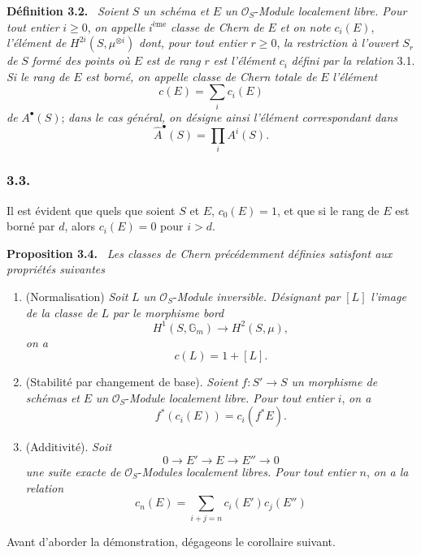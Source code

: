 \documentclass[11pt]{article}
\newenvironment{statement}[1]{\par\medskip\noindent\textbf{#1.}\ }{\par\medskip}
\begin{document}
\begin{statement}{Définition 3.2}
\emph{Soient} $S$ \emph{un schéma et} $E$ \emph{un} $\mathcal O_S$-\emph{Module localement libre. Pour tout entier} $i\ge0$, \emph{on appelle} $i^{\text{ème}}$ \emph{classe de Chern de} $E$ \emph{et on note} $c_i(E)$, \emph{l'élément de} $H^{2i}(S,\mu^{\otimes i})$ \emph{dont, pour tout entier} $r\ge0$, \emph{la restriction à l'ouvert} $S_r$ \emph{de} $S$ \emph{formé des points où} $E$ \emph{est de rang} $r$ \emph{est l'élément} $c_i$ \emph{défini par la relation} 3.1. \emph{Si le rang de} $E$ \emph{est borné, on appelle classe de Chern totale de} $E$ \emph{l'élément}
\[
c(E)=\sum_i c_i(E)
\]
\emph{de} $A^\bullet(S)$; \emph{dans le cas général, on désigne ainsi l'élément correspondant dans}
\[
\widehat A^{\bullet}(S)=\prod_i A^i(S).
\]
\end{statement}

\subsubsection*{3.3.}
Il est
évident que quels que soient $S$ et $E$, $c_0(E)=1$, et que si le rang de $E$ est borné par $d$, alors $c_i(E)=0$ pour $i>d$.

\begin{statement}{Proposition 3.4}
\emph{Les classes de Chern précédemment définies satisfont aux propriétés suivantes}
\begin{enumerate}[label=(\roman*)]
\item (Normalisation) \emph{Soit} $L$ \emph{un} $\mathcal O_S$-\emph{Module inversible. Désignant par} $[L]$ \emph{l'image de la classe de} $L$ \emph{par le morphisme bord}
\[
H^1(S,\mathbb G_m)\longrightarrow H^2(S,\mu),
\]
\emph{on a}
\[
c(L)=1+[L].
\]
\item (Stabilité par changement de base). \emph{Soient} $f:S'\to S$ \emph{un morphisme de schémas et} $E$ \emph{un} $\mathcal O_S$-\emph{Module localement libre. Pour tout entier} $i$, \emph{on a}
\[
f^*(c_i(E))=c_i(f^*E).
\]
\item (Additivité). \emph{Soit}
\[
0\to E'\to E\to E''\to0
\]
\emph{une suite exacte de} $\mathcal O_S$-\emph{Modules localement libres. Pour tout entier} $n$, \emph{on a la relation}
\[
c_n(E)=\sum_{i+j=n}c_i(E')c_j(E'')
\]
\end{enumerate}
\end{statement}

Avant d'aborder la démonstration, dégageons le corollaire suivant.
\end{document}
